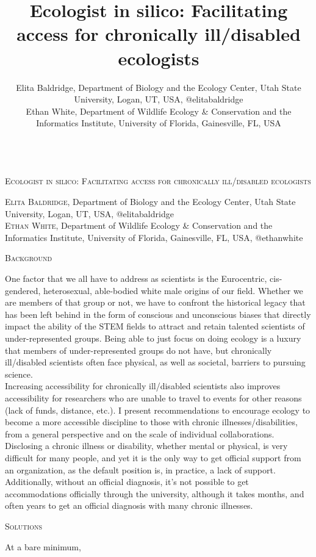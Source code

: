 \documentclass{beamer}
\author{Elita Baldridge, Department of Biology and the Ecology Center, Utah State University, Logan, UT, USA, @elitabaldridge  \\Ethan White, Department of Wildlife Ecology \& Conservation and the Informatics Institute, University of Florida, Gainesville, FL, USA}
\title[17pt]{Ecologist in silico: Facilitating access for chronically ill/disabled ecologists}
\date{}
\begin{document}
\begin{center} 
\begin{huge}
\textsc{%
\\Ecologist in silico: Facilitating access for chronically ill/disabled ecologists\\
 }
\end{huge}  
\begin{large}
\textsc{Elita Baldridge}, Department of Biology and the Ecology Center, Utah State University, Logan, UT, USA, @elitabaldridge\\  
\textsc{Ethan White}, Department of Wildlife Ecology \& Conservation and the Informatics Institute, University of Florida, Gainesville, FL, USA, @ethanwhite\\
\end{large}
\end{center}

\begin{minipage}{0.45\linewidth}
\begin{Large}
\begin{center}
\textsc{Background}
\end{center}
\end{Large}
One factor that we all have to address as scientists is the Eurocentric, cis-gendered, heterosexual, able-bodied white male origins of our field.  Whether we are members of that group or not, we have to confront the historical legacy that has been left behind in the form of conscious and unconscious biases that directly impact the ability of the STEM fields to attract and retain talented scientists of under-represented groups.  Being able to just focus on doing ecology is a luxury that members of under-represented groups do not have, but chronically ill/disabled scientists often face physical, as well as societal, barriers to pursuing science.\\ 


Increasing accessibility for chronically ill/disabled scientists also improves accessibility for researchers who are unable to travel to events for other reasons (lack of funds, distance, etc.). I present recommendations to encourage ecology to become a more accessible discipline to those with chronic illnesses/disabilities, from a general perspective and on the scale of individual collaborations.\\ 

Disclosing a chronic illness or disability, whether mental or physical, is very difficult for many people, and yet it is the only way to get official support from an organization, as the default position is, in practice, a lack of support.  Additionally, without an official diagnosis, it's not possible to get accommodations officially through the university, although it takes months, and often years to get an official diagnosis with many chronic illnesses.  
\end{minipage}
\begin{minipage}{0.45\linewidth}
\begin{Large}
\begin{center}
\textsc{Solutions}
\end{center}
\end{Large}
At a bare minimum, 
\end{minipage}
\end{document}
